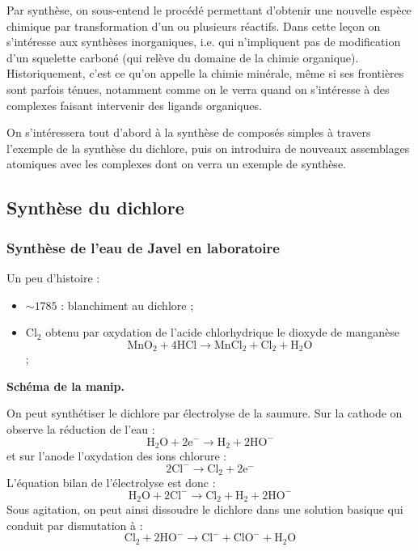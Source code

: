 Par synthèse, on sous-entend le procédé permettant d'obtenir une nouvelle espèce chimique par transformation d'un ou plusieurs réactifs. 
Dans cette leçon on s'intéresse aux synthèses inorganiques, i.e. qui n'impliquent pas de modification d'un squelette carboné (qui relève du domaine de la chimie organique).
Historiquement, c'est ce qu'on appelle la chimie minérale, même si ses frontières sont parfois ténues, notamment comme on le verra quand on s'intéresse à des complexes faisant intervenir des ligands organiques.

On s'intéressera tout d'abord à la synthèse de composés simples à travers l'exemple de la synthèse du dichlore, puis on introduira de nouveaux assemblages atomiques avec les complexes dont on verra un exemple de synthèse.

\subsection{Synthèse du dichlore}

\subsubsection{Synthèse de l'eau de Javel en laboratoire}

Un peu d'histoire :
\begin{itemize}
\item $\sim 1785$ : blanchiment au dichlore ;
\item $\mathrm{Cl_2}$ obtenu par oxydation de l'acide chlorhydrique le dioxyde de manganèse $$\mathrm{MnO_2 + 4HCl \rightarrow MnCl_2 + Cl_2 + H_2O}$$;
\end{itemize} 

\begin{slide}
\textbf{Schéma de la manip.}
\end{slide}

On peut synthétiser le dichlore par électrolyse de la saumure.
Sur la cathode on observe la réduction de l'eau :
\begin{equation*}
\mathrm{H_2O + 2e^- \rightarrow H_2 + 2HO^-}
\end{equation*}
et sur l'anode l'oxydation des ions chlorure :
\begin{equation*}
\mathrm{2Cl^- \rightarrow Cl_2 + 2e^-}
\end{equation*}
L'équation bilan de l'électrolyse est donc :
\begin{equation*}
\mathrm{H_2O + 2Cl^- \rightarrow Cl_2 + H_2 + 2HO^-}
\end{equation*}
Sous agitation, on peut ainsi dissoudre le dichlore dans une solution basique qui conduit par dismutation à :
\begin{equation*}
\mathrm{Cl_2 + 2HO^- \rightarrow Cl^- + ClO^- + H_2O} 
\end{equation*}

